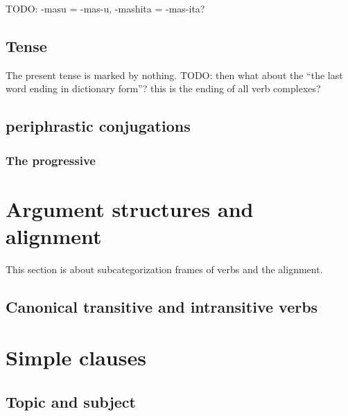 \documentclass[UTF8, a4paper, oneside, scheme=plain]{ctexart}
\begin{document}
TODO: 
-masu = -mas-u, -mashita = -mas-ita?

\subsection{Tense}

The present tense is marked by nothing. TODO: then what about the ``the last word ending in dictionary form''? this is the ending of all verb complexes?

\subsection{periphrastic conjugations}

\subsubsection{The progressive}

\section{Argument structures and alignment}\label{sec:arguments}

This section is about subcategorization frames of verbs and the alignment.

\subsection{Canonical transitive and intransitive verbs}

\section{Simple clauses}

\subsection{Topic and subject}\label{sec:topic-subject}
\end{document}

